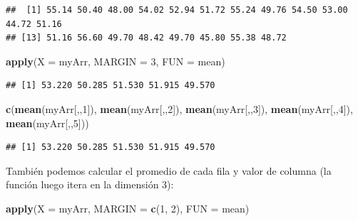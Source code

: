\documentclass[
]{book}
\newenvironment{Shaded}{\begin{snugshade}}{\end{snugshade}}
\newcommand{\DataTypeTok}[1]{\textcolor[rgb]{0.13,0.29,0.53}{#1}}
\newcommand{\DecValTok}[1]{\textcolor[rgb]{0.00,0.00,0.81}{#1}}
\newcommand{\KeywordTok}[1]{\textcolor[rgb]{0.13,0.29,0.53}{\textbf{#1}}}
\newcommand{\NormalTok}[1]{#1}
\begin{document}
\begin{verbatim}
##  [1] 55.14 50.40 48.00 54.02 52.94 51.72 55.24 49.76 54.50 53.00 44.72 51.16
## [13] 51.16 56.60 49.70 48.42 49.70 45.80 55.38 48.72
\end{verbatim}

\begin{Shaded}
\begin{Highlighting}[]
\KeywordTok{apply}\NormalTok{(}\DataTypeTok{X =}\NormalTok{ myArr, }\DataTypeTok{MARGIN =} \DecValTok{3}\NormalTok{, }\DataTypeTok{FUN =}\NormalTok{ mean)}
\end{Highlighting}
\end{Shaded}

\begin{verbatim}
## [1] 53.220 50.285 51.530 51.915 49.570
\end{verbatim}

\begin{Shaded}
\begin{Highlighting}[]
\KeywordTok{c}\NormalTok{(}\KeywordTok{mean}\NormalTok{(myArr[,,}\DecValTok{1}\NormalTok{]), }\KeywordTok{mean}\NormalTok{(myArr[,,}\DecValTok{2}\NormalTok{]), }\KeywordTok{mean}\NormalTok{(myArr[,,}\DecValTok{3}\NormalTok{]), }
  \KeywordTok{mean}\NormalTok{(myArr[,,}\DecValTok{4}\NormalTok{]), }\KeywordTok{mean}\NormalTok{(myArr[,,}\DecValTok{5}\NormalTok{]))}
\end{Highlighting}
\end{Shaded}

\begin{verbatim}
## [1] 53.220 50.285 51.530 51.915 49.570
\end{verbatim}

También podemos calcular el promedio de cada fila y valor de columna (la función luego itera en la dimensión 3):

\begin{Shaded}
\begin{Highlighting}[]
\KeywordTok{apply}\NormalTok{(}\DataTypeTok{X =}\NormalTok{ myArr, }\DataTypeTok{MARGIN =} \KeywordTok{c}\NormalTok{(}\DecValTok{1}\NormalTok{, }\DecValTok{2}\NormalTok{), }\DataTypeTok{FUN =}\NormalTok{ mean)}
\end{Highlighting}
\end{Shaded}
\end{document}
